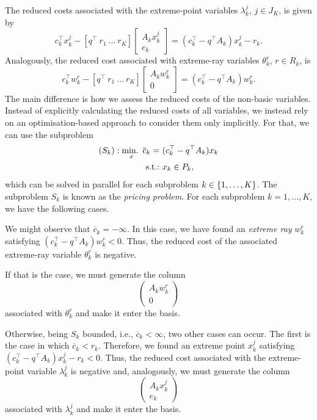 The reduced costs associated with the extreme-point variables $\lambda_k^j$, $j \in J_K$, is given by
%
\begin{equation}
	c_k^\top x_k^j - [q^\top ~ r_1 ~ \dots ~ r_K]	\begin{bmatrix} A_k x_k^j \\ e_k \end{bmatrix} = (c_k^\top - q^\top A_k)x_k^j - r_k.
\end{equation}
%
Analogously, the reduced cost associated with extreme-ray variables $\theta_k^r$, $r \in R_k$, is
\begin{equation}
	c_k^\top w_k^r - [q^\top ~ r_1 ~ \dots ~ r_K]	\begin{bmatrix} A_k w_k^r \\ 0 \end{bmatrix} = (c_k^\top - q^\top A_k)w_k^r.
\end{equation}
%
The main difference is how we assess the reduced costs of the non-basic variables. Instead of explicitly calculating the reduced costs of all variables, we instead rely on an optimisation-based approach to consider them only implicitly. For that, we can use the subproblem 
%
\begin{align*}
	(S_k):  \mathop{\text{min.~}}_x \overline{c}_k = \ & (c_k^\top - q^\top A_k)x_k \\
	\mathop{\text{s.t.:~}} & x_k \in P_k,			
\end{align*} 
%
which can be solved in parallel for each subproblem $k \in \left\{ 1,\dots,K \right \}$. The subproblem $S_k$ is known as the \emph{pricing problem}. For each subproblem $k = 1, \dots, K$, we have the following cases.

 We might observe that $\overline{c}_k = -\infty$. In this case, we have found an \emph{extreme ray} $w_k^r$ satisfying $(c_k^\top - q^\top A_k)w_k^r < 0$. Thus, the reduced cost of the associated extreme-ray variable $\theta_k^r$ is negative. 

If that is the case, we must generate the column
%
\begin{equation*}
	\begin{pmatrix}
		A_kw_k^r \\ 0
	\end{pmatrix}
\end{equation*}
%
associated with $\theta_k^r$ and make it enter the basis.		

Otherwise, being $S_k$ bounded, i.e., $\overline{c}_k < \infty$, two other cases can occur. The first is the case in which $\overline{c}_k < r_k$. Therefore, we found an extreme point $x_k^j$ satisfying $(c_k^\top - q^\top A_k)x_k^j - r_k < 0$. Thus, the reduced cost associated with the extreme-point variable $\lambda_k^j$ is negative and, analogously, we must generate the column
%
\begin{equation*}
	\begin{pmatrix}
		A_kx_k^j \\ e_k
	\end{pmatrix}
\end{equation*}
%
associated with $\lambda_k^j$ and make it enter the basis.

